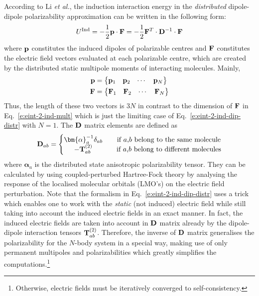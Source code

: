 \documentclass[b5paper,oneside,fleqn,11pt]{book}
\newcommand{\BM}[1]{\bm{#1}}
\begin{document}
\begin{refsection}
According to Li \emph{et al.}, \citep{Li.Netzloff.Gordon.JCP.2006} 
the induction interaction energy in the 
\emph{distributed} dipole\hyp{}dipole polarizability approximation 
can be written in the following form:
%
\begin{equation} \label{e:eint-2-ind-dip-distr}
U^{\rm Ind} = - \frac{1}{2} {\bf p} \cdot {\bf F} = - \frac{1}{2} {\bf F}^T \cdot {\bf D}^{-1} \cdot {\bf F}
\end{equation}
%
where ${\bf p}$ constitutes the induced dipoles of 
polarizable centres and ${\bf F}$ constitutes the electric field 
vectors evaluated at each polarizable centre, which are created by the 
distributed static multipole moments of interacting molecules.
Mainly,
%
\begin{subequations} \label{e:pf}
\begin{align}
 {\bf p} &= 
 \begin{Bmatrix}
  {\bf p}_1 & {\bf p}_2 & \cdots & {\bf p}_N
 \end{Bmatrix} \\
 {\bf F}&= 
 \begin{Bmatrix}
  {\bf F}_1 & {\bf F}_2 & \cdots & {\bf F}_N
 \end{Bmatrix}
\end{align}
\end{subequations}
%
Thus, the length of these two vectors is $3N$ in contrast to the dimension
of $\bf F$ in Eq.~\eqref{e:eint-2-ind-mult} which is just the limiting case of 
Eq.~\eqref{e:eint-2-ind-dip-distr} with $N=1$.
The $\bf D$ matrix elements are defined as
%
\begin{equation} \label{e:D-matrix}
{\bf D}_{ab} = 
\left\{\begin{matrix}               
{\BM \alpha}_a^{-1} \delta_{ab} && \text{if $a$,$b$ belong to the same molecule} \\
-{\bf T}_{ab}^{(2)}             && \text{if $a$,$b$ belong to different molecules}
\end{matrix}\right. 
\end{equation}
%
where ${\BM \alpha}_a$ is the distributed state anisotropic polarizability
tensor. They can be calculated by using coupled\hyp{}perturbed Hartree\hyp{}Fock
theory by analysing the response of the localised molecular orbitals
(LMO's) on the electric field perturbation. Note that the formalism
in Eq.~\eqref{e:eint-2-ind-dip-distr} uses a trick which enables one
to work with the \emph{static} (not induced) electric field while still taking
into account the induced electric fields in an exact manner. In fact,
the induced electric fields are taken into account in $\bf D$ matrix already
by the dipole\hyp{}dipole interaction tensors ${\bf T}_{ab}^{(2)}$.
Therefore, the inverse of $\bf D$ matrix generalises
the polarizability for the $N$-body system in a special way, making use
of only permanent multipoles and polarizabilities which greatly simplifies
the computations.\footnote{Otherwise, electric fields must be iteratively converged to
self\hyp{}consistency.}


\end{refsection}
\end{document}
